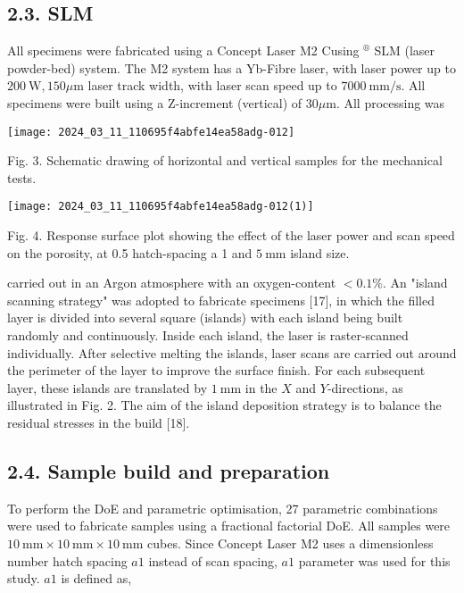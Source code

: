 \documentclass[10pt]{article}
\begin{document}
\subsection*{2.3. SLM}
All specimens were fabricated using a Concept Laser M2 Cusing $^{\circledR}$ SLM (laser powder-bed) system. The M2 system has a Yb-Fibre laser, with laser power up to $200 \mathrm{~W}, 150 \mu \mathrm{m}$ laser track width, with laser scan speed up to $7000 \mathrm{~mm} / \mathrm{s}$. All specimens were built using a Z-increment (vertical) of $30 \mu \mathrm{m}$. All processing was

\begin{center}
\texttt{[image: 2024\_03\_11\_110695f4abfe14ea58adg-012]}
\end{center}

Fig. 3. Schematic drawing of horizontal and vertical samples for the mechanical tests.

\begin{center}
\texttt{[image: 2024\_03\_11\_110695f4abfe14ea58adg-012(1)]}
\end{center}

Fig. 4. Response surface plot showing the effect of the laser power and scan speed on the porosity, at 0.5 hatch-spacing a 1 and $5 \mathrm{~mm}$ island size.

carried out in an Argon atmosphere with an oxygen-content $<0.1 \%$. An "island scanning strategy" was adopted to fabricate specimens [17], in which the filled layer is divided into several square (islands) with each island being built randomly and continuously. Inside each island, the laser is raster-scanned individually. After selective melting the islands, laser scans are carried out around the perimeter of the layer to improve the surface finish. For each subsequent layer, these islands are translated by $1 \mathrm{~mm}$ in the $X$ and $Y$-directions, as illustrated in Fig. 2. The aim of the island deposition strategy is to balance the residual stresses in the build [18].

\subsection*{2.4. Sample build and preparation}
To perform the DoE and parametric optimisation, 27 parametric combinations were used to fabricate samples using a fractional factorial DoE. All samples were $10 \mathrm{~mm} \times 10 \mathrm{~mm} \times 10 \mathrm{~mm}$ cubes. Since Concept Laser M2 uses a dimensionless number hatch spacing $a 1$ instead of scan spacing, $a 1$ parameter was used for this study. $a 1$ is defined as,
\end{document}
